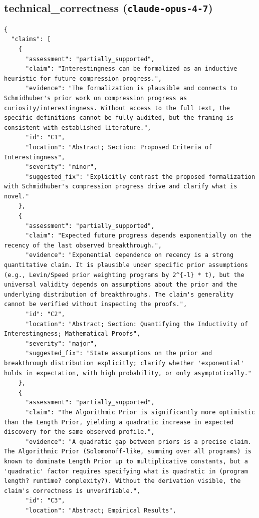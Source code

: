\documentclass[11pt]{article}
\begin{document}
\subsection*{technical_correctness (\texttt{claude-opus-4-7})}
\begin{verbatim}
{
  "claims": [
    {
      "assessment": "partially_supported",
      "claim": "Interestingness can be formalized as an inductive heuristic for future compression progress.",
      "evidence": "The formalization is plausible and connects to Schmidhuber's prior work on compression progress as curiosity/interestingness. Without access to the full text, the specific definitions cannot be fully audited, but the framing is consistent with established literature.",
      "id": "C1",
      "location": "Abstract; Section: Proposed Criteria of Interestingness",
      "severity": "minor",
      "suggested_fix": "Explicitly contrast the proposed formalization with Schmidhuber's compression progress drive and clarify what is novel."
    },
    {
      "assessment": "partially_supported",
      "claim": "Expected future progress depends exponentially on the recency of the last observed breakthrough.",
      "evidence": "Exponential dependence on recency is a strong quantitative claim. It is plausible under specific prior assumptions (e.g., Levin/Speed prior weighting programs by 2^{-l} * t), but the universal validity depends on assumptions about the prior and the underlying distribution of breakthroughs. The claim's generality cannot be verified without inspecting the proofs.",
      "id": "C2",
      "location": "Abstract; Section: Quantifying the Inductivity of Interestingness; Mathematical Proofs",
      "severity": "major",
      "suggested_fix": "State assumptions on the prior and breakthrough distribution explicitly; clarify whether 'exponential' holds in expectation, with high probability, or only asymptotically."
    },
    {
      "assessment": "partially_supported",
      "claim": "The Algorithmic Prior is significantly more optimistic than the Length Prior, yielding a quadratic increase in expected discovery for the same observed profile.",
      "evidence": "A quadratic gap between priors is a precise claim. The Algorithmic Prior (Solomonoff-like, summing over all programs) is known to dominate Length Prior up to multiplicative constants, but a 'quadratic' factor requires specifying what is quadratic in (program length? runtime? complexity?). Without the derivation visible, the claim's correctness is unverifiable.",
      "id": "C3",
      "location": "Abstract; Empirical Results",

\end{verbatim}
\end{document}
